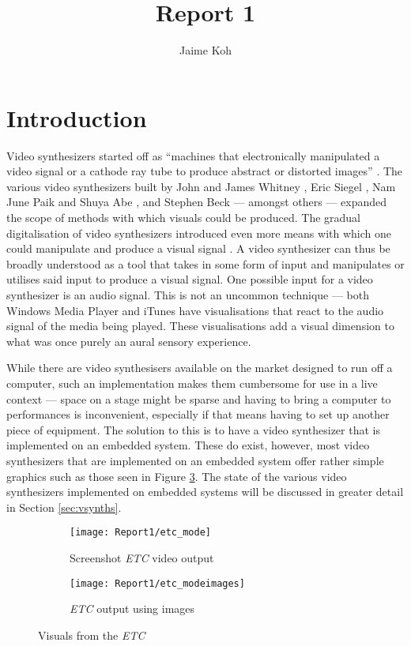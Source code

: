 \documentclass{report}
\title{Report 1}
\author{Jaime Koh}
\begin{document}
\newpage
\maketitle
\tableofcontents
\newpage

\section*{Introduction}
\markright{}

Video synthesizers started off as ``machines that electronically manipulated a video signal or a cathode ray tube to produce abstract or distorted images'' \cite{Collopy2014}. The various video synthesizers built by John and James Whitney \cite{Patterson2009}, Eric Siegel \cite{ElectronicArtsIntermix}, Nam June Paik and Shuya Abe \cite{Furlong1983}, and Stephen Beck \cite{Beck1992} --- amongst others --- expanded the scope of methods with which visuals could be produced. The gradual digitalisation of video synthesizers introduced even more means with which one could manipulate and produce a visual signal \cite{Collopy2014}. A video synthesizer can thus be broadly understood as a tool that takes in some form of input and manipulates or utilises said input to produce a visual signal. One possible input for a video synthesizer is an audio signal. This is not an uncommon technique --- both Windows Media Player and iTunes have visualisations that react to the audio signal of the media being played. These visualisations add a visual dimension to what was once purely an aural sensory experience. \par

While there are video synthesisers available on the market designed to run off a computer, such an implementation makes them cumbersome for use in a live context --- space on a stage might be sparse and having to bring a computer to performances is inconvenient, especially if that means having to set up another piece of equipment. The solution to this is to have a video synthesizer that is implemented on an embedded system. These do exist, however, most video synthesizers that are implemented on an embedded system offer rather simple graphics such as those seen in Figure \ref{fig:etc}. The state of the various video synthesizers implemented on embedded systems will be discussed in greater detail in Section \ref{sec:vsynths}.

\begin{figure}[b]
  \begin{subfigure}{0.5\textwidth}
  \texttt{[image: Report1/etc\_mode]}
  \caption{Screenshot \textit{ETC} video output}
  \label{fig:etc_mode}
\end{subfigure}
\begin{subfigure}{0.5\textwidth}
  \texttt{[image: Report1/etc\_modeimages]}
  \caption{\textit{ETC} output using images}
  \label{fig:etc_modeimages}
\end{subfigure}
\caption{Visuals from the \textit{ETC}}
\label{fig:etc}
\end{figure}
\end{document}
